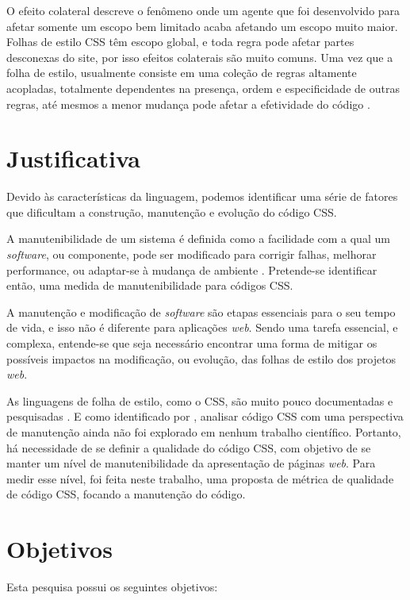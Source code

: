 O efeito colateral descreve o fenômeno onde um agente que foi desenvolvido para afetar somente um escopo bem limitado acaba afetando um escopo muito maior. Folhas de estilo CSS têm escopo global, e toda regra pode afetar partes desconexas do site, por isso efeitos colaterais são muito comuns. Uma vez que a folha de estilo, usualmente consiste em uma coleção de regras altamente acopladas, totalmente dependentes na presença, ordem e especificidade de outras regras, até mesmos a menor mudança pode afetar a efetividade do código \cite{Walton:2015}.

\section{Justificativa}

Devido às características da linguagem, podemos identificar uma série de fatores que dificultam a construção, manutenção e evolução do código CSS. 

A manutenibilidade de um sistema é definida como a facilidade com a qual um \textit{software}, ou componente, pode ser modificado para corrigir falhas, melhorar performance, ou adaptar-se à mudança de ambiente \cite{Ieee1990}. Pretende-se identificar então, uma medida de manutenibilidade para códigos CSS.

A manutenção e modificação de \textit{software} são etapas essenciais para o seu tempo de vida, e isso não é diferente para aplicações \textit{web}. Sendo uma tarefa essencial, e complexa, entende-se que seja necessário encontrar uma forma de mitigar os possíveis impactos na modificação, ou evolução, das folhas de estilo dos projetos \textit{web}.

As linguagens de folha de estilo, como o CSS, são muito pouco documentadas e pesquisadas \cite{Marden1999,Quint2007,Geneves2012}. E como identificado por , analisar código CSS com uma perspectiva de manutenção ainda não foi explorado em nenhum trabalho científico. Portanto, há necessidade de se definir a qualidade do código CSS, com objetivo de se manter um nível de manutenibilidade da apresentação de páginas \textit{web}. Para medir esse nível, foi feita neste trabalho, uma proposta de métrica de qualidade de código CSS, focando a manutenção do código.

\section{Objetivos}
Esta pesquisa possui os seguintes objetivos:

